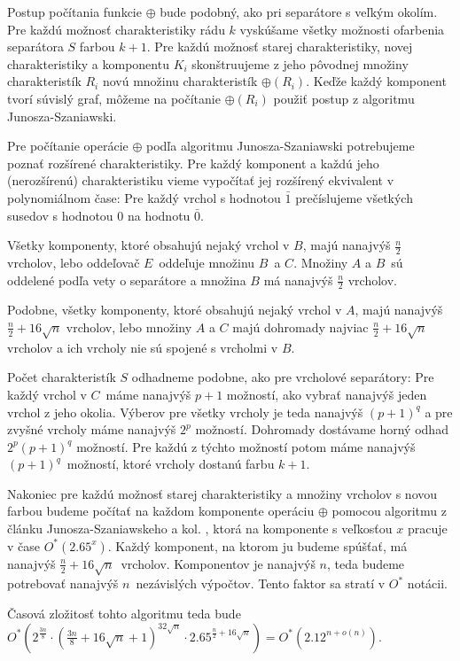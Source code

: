 Postup počítania funkcie $\oplus$ bude podobný, ako pri separátore s veľkým okolím. Pre každú možnosť
charakteristiky rádu $k$ vyskúšame všetky možnosti ofarbenia separátora $S$ farbou $k+1$. Pre každú
možnosť starej charakteristiky, novej charakteristiky a komponentu $K_i$ skonštruujeme z jeho pôvodnej
množiny charakteristík $R_i$ novú množinu charakteristík $\oplus(R_i)$. Keďže každý komponent tvorí súvislý
graf, môžeme na počítanie $\oplus(R_i)$ použiť postup z algoritmu Junosza-Szaniawski.

Pre počítanie operácie $\oplus$ podľa algoritmu Junosza-Szaniawski potrebujeme poznať rozšírené charakteristiky.
Pre každý komponent a každú jeho (nerozšírenú) charakteristiku vieme vypočítať jej rozšírený ekvivalent v
polynomiálnom čase: Pre každý vrchol s hodnotou $\bar{1}$ prečíslujeme všetkých susedov s hodnotou $0$
na hodnotu $\bar{0}$.

Všetky komponenty, ktoré obsahujú nejaký vrchol v $B$, majú nanajvýš $\frac{n}{2}$ vrcholov, lebo
oddeľovač $E$ oddeľuje množinu $B$ a $C$. Množiny $A$ a $B$ sú oddelené podľa vety o separátore
a množina $B$ má nanajvýš $\frac{n}{2}$ vrcholov.

Podobne, všetky komponenty, ktoré obsahujú nejaký vrchol v $A$, majú nanajvýš $\frac{n}{2} + 16 \sqrt{n}$
vrcholov, lebo množiny $A$ a $C$ majú dohromady najviac $\frac{n}{2} + 16 \sqrt{n}$ vrcholov a ich vrcholy
nie sú spojené s vrcholmi v $B$.

Počet charakteristík $S$ odhadneme podobne, ako pre vrcholové separátory: Pre každý vrchol v $C$ máme
nanajvýš $p+1$ možností, ako vybrať nanajvýš jeden vrchol z jeho okolia. Výberov pre všetky vrcholy je
teda nanajvýš $(p+1)^q$ a pre zvyšné vrcholy máme nanajvýš $2^p$ možností. Dohromady dostávame horný
odhad $2^p (p+1)^q$ možností. Pre každú z týchto možností potom máme nanajvýš $(p+1)^q$ možností, ktoré
vrcholy dostanú farbu $k+1$.

Nakoniec pre každú možnosť starej charakteristiky a množiny vrcholov s novou farbou budeme počítať
na každom komponente operáciu $\oplus$ pomocou algoritmu z článku Junosza-Szaniawskeho a kol. \cite{junosza_fast},
ktorá na komponente s veľkosťou $x$ pracuje v čase $O^*(2.65^x)$. Každý komponent, na ktorom ju budeme
spúšťať, má nanajvýš $\frac{n}{2} + 16\sqrt{n}$ vrcholov. Komponentov je nanajvýš $n$, teda budeme
potrebovať nanajvýš $n$ nezávislých výpočtov. Tento faktor sa stratí v $O^*$ notácii.

Časová zložitosť tohto algoritmu teda bude $O^*(2^{\frac{3n}{8}} \cdot (\frac{3n}{8} + 16 \sqrt{n} + 1)^{32 \sqrt{n}} \cdot 2.65^{\frac{n}{2} + 16 \sqrt{n}}) = O^*(2.12^{n + o(n)})$.

